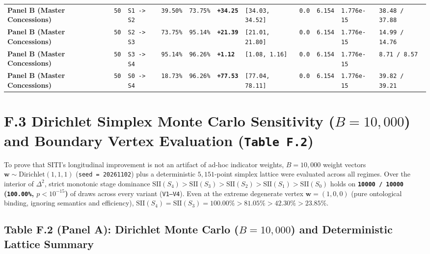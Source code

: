 \documentclass[10pt,a4paper]{article}
\begin{document}
{\begin{longtable}{p{}p{}p{}p{}p{}p{}p{}p{}p{}p{}p{}}
\textbf{Panel B (Master Concessions)} & \texttt{50} & \texttt{S1 -> S2} & \texttt{39.50\%} & \texttt{73.75\%} & \textbf{\texttt{+34.25}} & \texttt{[34.03, 34.52]} & \texttt{0.0} & \texttt{6.154} & \texttt{1.776e-15} & \texttt{38.48 / 37.88} \\
\textbf{Panel B (Master Concessions)} & \texttt{50} & \texttt{S2 -> S3} & \texttt{73.75\%} & \texttt{95.14\%} & \textbf{\texttt{+21.39}} & \texttt{[21.01, 21.80]} & \texttt{0.0} & \texttt{6.154} & \texttt{1.776e-15} & \texttt{14.99 / 14.76} \\
\textbf{Panel B (Master Concessions)} & \texttt{50} & \texttt{S3 -> S4} & \texttt{95.14\%} & \texttt{96.26\%} & \textbf{\texttt{+1.12}} & \texttt{[1.08, 1.16]} & \texttt{0.0} & \texttt{6.154} & \texttt{1.776e-15} & \texttt{8.71 / 8.57} \\
\textbf{Panel B (Master Concessions)} & \texttt{50} & \texttt{S0 -> S4} & \texttt{18.73\%} & \texttt{96.26\%} & \textbf{\texttt{+77.53}} & \texttt{[77.04, 78.11]} & \texttt{0.0} & \texttt{6.154} & \texttt{1.776e-15} & \texttt{39.82 / 39.21} \\
\bottomrule
\end{longtable}
}



\section*{F.3 Dirichlet Simplex Monte Carlo Sensitivity ($B = 10,000$) and Boundary Vertex Evaluation (\texttt{Table F.2})}

To prove that SITI's longitudinal improvement is not an artifact of ad-hoc indicator weights, $B = 10,000$ weight vectors $\mathbf{w} \sim \text{Dirichlet}(1,1,1)$ (\texttt{seed = 20261102}) plus a deterministic $5,151$-point simplex lattice were evaluated across all regimes. Over the interior of $\Delta^2$, strict monotonic stage dominance $\text{SII}(S_4) > \text{SII}(S_3) > \text{SII}(S_2) > \text{SII}(S_1) > \text{SII}(S_0)$ holds on \textbf{\texttt{10000 / 10000} (\texttt{100.00\%}, $p < 10^{-15}$)} of draws across every variant (\texttt{V1--V4}). Even at the extreme degenerate vertex $\mathbf{w} = (1,0,0)$ (pure ontological binding, ignoring semantics and efficiency), $\text{SII}(S_4) = \text{SII}(S_3) = 100.00\% > 81.05\% > 42.30\% > 23.85\%$.

\subsection*{Table F.2 (Panel A): Dirichlet Monte Carlo ($B = 10,000$) and Deterministic Lattice Summary}
\end{document}
